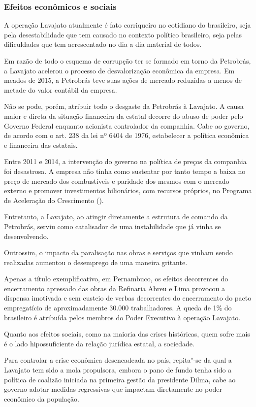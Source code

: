 \subsubsection{Efeitos econômicos e sociais}

A operação Lavajato atualmente é fato corriqueiro no cotidiano do
brasileiro, seja pela desestabilidade que tem causado no contexto
político brasileiro, seja pelas dificuldades que tem acrescentado no dia
a dia material de todos.

Em razão de todo o esquema de corrupção ter se formado em torno da
Petrobrás, a Lavajato acelerou o processo de desvalorização econômica da
empresa. Em meados de 2015, a Petrobrás teve suas ações de mercado
reduzidas a menos de metade do valor contábil da empresa.

Não se pode, porém, atribuir todo o desgaste da Petrobrás à Lavajato. A
causa maior e direta da situação financeira da estatal decorre do abuso
de poder pelo Governo Federal enquanto acionista controlador da
companhia. Cabe ao governo, de acordo com o art. 238 da lei nº 6404 de
1976, estabelecer a política econômica e financeira das estatais.

Entre 2011 e 2014, a intervenção do governo na política de preços da
companhia foi desastrosa. A empresa não tinha como sustentar por tanto
tempo a baixa no preço de mercado dos combustíveis e paridade dos mesmos
com o mercado externo e promover investimentos bilionários, com recursos
próprios, no Programa de Aceleração do Crescimento ().

Entretanto, a Lavajato, ao atingir diretamente a estrutura de comando da
Petrobrás, serviu como catalisador de uma instabilidade que já vinha se
desenvolvendo.

Outrossim, o impacto da paralisação nas obras e serviços que vinham
sendo realizadas aumentou o desemprego de uma maneira gritante.

Apenas a título exemplificativo, em Pernambuco, os efeitos decorrentes
do encerramento apressado das obras da Refinaria Abreu e Lima provocou a
dispensa imotivada e sem custeio de verbas decorrentes do encerramento
do pacto empregatício de aproximadamente 30.000 trabalhadores. A queda
de 1\% do  brasileiro é atribuída pelos membros do Poder Executivo à
operação Lavajato.

Quanto aos efeitos sociais, como na maioria das crises históricas, quem
sofre mais é o lado hipossuficiente da relação jurídica estatal, a
sociedade.

Para controlar a crise econômica desencadeada no país, repita"-se da qual
a Lavajato tem sido a mola propulsora, embora o pano de fundo tenha sido
a política de coalizão iniciada na primeira gestão da presidente Dilma,
cabe ao governo adotar medidas regressivas que impactam diretamente no
poder econômico da população.

